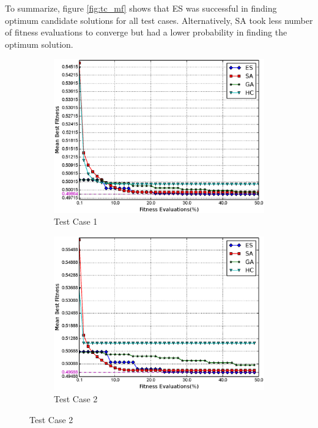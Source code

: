 \documentclass[conference]{IEEEtran}
\begin{document}
To summarize, figure \ref{fig:tc_mf} shows that ES was successful in finding optimum candidate solutions for all test cases. Alternatively, SA took less number of fitness evaluations to converge but had a lower probability in finding the optimum solution.
\begin{figure}
    \centering
    \begin{subfigure}{\columnwidth}
        \includegraphics[width=\columnwidth]{FIG/tc1_mf.eps}%
        \caption{Test Case 1}%
    \label{fig:tc1_mf}%
    \end{subfigure}\hfill%
    \begin{subfigure}{\columnwidth}
        \includegraphics[width=\columnwidth]{FIG/tc2_mf.eps}%
        \caption{Test Case 2}%
        \label{fig:tc2_mf}%

\end{subfigure}
\end{figure}
\end{document}
